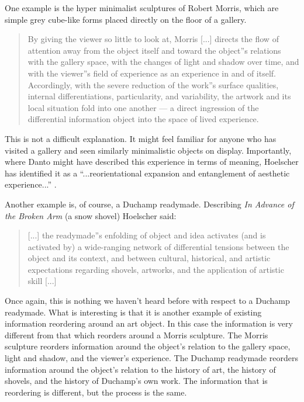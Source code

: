                 One example is the hyper minimalist sculptures of Robert Morris, which are simple grey cube-like forms placed directly on the floor of a gallery.

                \begin{quote}
                    By giving the viewer so little to look at, Morris [...] directs the flow of attention away from the object itself and toward the object”s relations with the gallery space, with the changes of light and shadow over time, and with the viewer”s field of experience as an experience in and of itself. Accordingly, with the severe reduction of the work”s surface qualities, internal differentiations, particularity, and variability, the artwork and its local situation fold into one another — a direct ingression of the differential information object into the space of lived experience. \citep[p.78]{HoelscherArtAsInfrmtn2021}
                \end{quote}

                This is not a difficult explanation. It might feel familiar for anyone who has visited a gallery and seen similarly minimalistic objects on display. Importantly, where Danto might have described this experience in terms of meaning, Hoelscher has identified it as a “...reorientational expansion and entanglement of aesthetic experience...” \citep[p.78]{HoelscherArtAsInfrmtn2021}.

                Another example is, of course, a Duchamp readymade. Describing \emph{In Advance of the Broken Arm} (a snow shovel) Hoelscher said:

                \begin{quote}
                    [...] the readymade”s enfolding of object and idea activates (and is activated by) a wide-ranging network of differential tensions between the object and its context, and between cultural, historical, and artistic expectations regarding shovels, artworks, and the application of artistic skill [...]
                \end{quote}

                Once again, this is nothing we haven't heard before with respect to a Duchamp readymade. What is interesting is that it is another example of existing information reordering around an art object. In this case the information is very different from that which reorders around a Morris sculpture. The Morris sculpture reorders information around the object's relation to the gallery space, light and shadow, and the viewer's experience. The Duchamp readymade reorders information around the object's relation to the history of art, the history of shovels, and the history of Duchamp's own work. The information that is reordering is different, but the process is the same.


